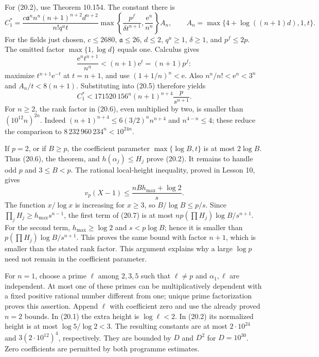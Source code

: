 \documentclass[
  11pt,
  a4paper,
]{article}
\begin{document}
For (20.2), use Theorem 10.154. The constant there is \[
 C_1^*=
 \frac{c\mathfrak a^n n^n(n+1)^{n+2}d^{n+2}}
      {n!q^ut}
 \max\left\{\frac{p^f}{\delta t^{n+1}},
                         \frac{\mathrm e^n}{n^n}\right\}A_n,
 \qquad
 A_n=\max\{4+\log((n+1)d),1,t\}.
 \tag{20.5}
\] For the fields just chosen, \(c\le2680\), \(\mathfrak a\le26\),
\(d\le2\), \(q^u\ge1\), \(\delta\ge1\), and \(p^f\le2p\). The omitted
factor \(\max\{1,\log d\}\) equals one. Calculus gives \[
 \frac{\mathrm e^nt^{n+1}}{n^n}<(n+1)\mathrm e^t=(n+1)p^f:
\] maximize \(t^{n+1}\mathrm e^{-t}\) at \(t=n+1\), and use
\((1+1/n)^n<\mathrm e\). Also \(n^n/n!<\mathrm e^n<3^n\) and
\(A_n/t<8(n+1)\). Substituting into (20.5) therefore yields \[
 C_1^*<
 171520\,156^n(n+1)^{n+4}\frac p{s^{n+1}}.
 \tag{20.6}
\] For \(n\ge2\), the rank factor in (20.6), even multiplied by two, is
smaller than \((10^{12}n)^{2n}\). Indeed
\((n+1)^{n+4}\le6(3/2)^n n^{n+4}\) and \(n^{4-n}\le4\); these reduce the
comparison to \(8\,232\,960\,234^n<10^{24n}\).

If \(p=2\), or if \(B\ge p\), the coefficient parameter
\(\max\{\log B,t\}\) is at most \(2\log B\). Thus (20.6), the theorem,
and \(h(\alpha_j)\le H_j\) prove (20.2). It remains to handle odd \(p\)
and \(3\le B<p\). The rational local-height inequality, proved in Lesson
10, gives \[
 v_p(X-1)\le
 \frac{nB h_{\max}+\log2}{s}.
 \tag{20.7}
\] The function \(x/\log x\) is increasing for \(x\ge3\), so
\(B/\log B\le p/s\). Since \(\prod_jH_j\ge h_{\max}s^{n-1}\), the first
term of (20.7) is at most \(n p(\prod H_j)\log B/s^{n+1}\). For the
second term, \(h_{\max}\ge\log2\) and \(s<p\log B\); hence it is smaller
than \(p(\prod H_j)\log B/s^{n+1}\). This proves the same bound with
factor \(n+1\), which is smaller than the stated rank factor. This
argument explains why a large \(\log p\) need not remain in the
coefficient parameter.

For \(n=1\), choose a prime \(\ell\) among \(2,3,5\) such that
\(\ell\ne p\) and \(\alpha_1,\ell\) are independent. At most one of
these primes can be multiplicatively dependent with a fixed positive
rational number different from one; unique prime factorization proves
this assertion. Append \(\ell\) with coefficient zero and use the
already proved \(n=2\) bounds. In (20.1) the extra height is
\(\log\ell<2\). In (20.2) its normalized height is at most
\(\log5/\log2<3\). The resulting constants are at most \(2\cdot10^{24}\)
and \(3(2\cdot10^{12})^4\), respectively. They are bounded by \(D\) and
\(D^2\) for \(D=10^{30}\). Zero coefficients are permitted by both
programme estimates.
\end{document}
